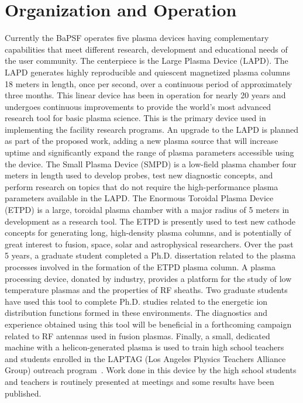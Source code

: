 \documentclass[11pt]{article}
\begin{document}
\section{Organization and Operation}

Currently the BaPSF operates five plasma devices having complementary
capabilities that meet different research, development and educational
needs of the user community. The centerpiece is the Large Plasma Device
(LAPD). The LAPD generates highly reproducible and quiescent magnetized
plasma columns 18 meters in length, once per second, over a continuous
period of approximately three months. This linear device has been in operation for nearly 20 years
and undergoes continuous improvements to provide the world's
most advanced research tool for basic plasma science. This is the
primary device used in implementing
the facility research programs. An upgrade to the LAPD is planned as
part of the proposed work, adding a new plasma source that will increase
uptime and significantly expand the range of plasma parameters
accessible using the device. The Small Plasma Device (SMPD) is a
low-field plasma chamber four meters in length used to develop probes,
test new diagnostic concepts, and perform research on topics that do not
require the high-performance plasma parameters available in the LAPD.
The Enormous Toroidal Plasma Device (ETPD) is a large, toroidal plasma
chamber with a major radius of 5 meters in development as a research
tool. The ETPD is presently used to test new cathode concepts for
generating long, high-density plasma columns, and is potentially of
great interest to fusion, space, solar and astrophysical researchers.
Over the past 5 years, a graduate student completed a Ph.D.
dissertation related to the plasma processes involved in the formation
of the ETPD plasma column. A plasma processing device, donated by
industry, provides a platform for the study of low temperature plasmas
and the properties of RF sheaths. Two graduate students have used this
tool to complete Ph.D. studies related to the energetic ion distribution
functions formed in these environments. The diagnostics and experience
obtained using this tool will be beneficial in a forthcoming campaign
related to RF antennas used in fusion plasmas. Finally, a small,
dedicated machine with a helicon-generated plasma is used to train high
school teachers and students enrolled in the LAPTAG (Los Angeles
Physics Teachers Alliance Group) outreach program~\citep{laptag}.
Work done in this device by the high school students and teachers is
routinely presented at meetings and some results have been published.
\end{document}
